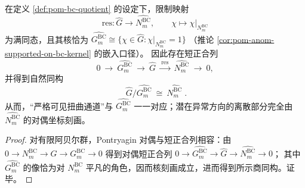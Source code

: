 \begin{corollary}\label{cor:pom-bc-pontryagin-dual-classification}
在定义 \ref{def:pom-bc-quotient} 的设定下，限制映射
\[
\mathrm{res}:\widehat G\longrightarrow \widehat{N^{\mathrm{BC}}_m},
\qquad
\chi\longmapsto \chi|_{N^{\mathrm{BC}}_m}
\]
为满同态，且其核恰为
\(\widehat{G^{\mathrm{BC}}_m}\cong\{\chi\in\widehat G:\chi|_{N^{\mathrm{BC}}_m}=1\}\)
（推论 \ref{cor:pom-anom-supported-on-bc-kernel} 的嵌入口径）。
因此存在短正合列
\[
0\ \longrightarrow\ \widehat{G^{\mathrm{BC}}_m}\ \longrightarrow\ \widehat G\ \xrightarrow{\ \mathrm{res}\ }\ \widehat{N^{\mathrm{BC}}_m}\ \longrightarrow\ 0,
\]
并得到自然同构
\[
\boxed{\;
\widehat G/\widehat{G^{\mathrm{BC}}_m}\ \cong\ \widehat{N^{\mathrm{BC}}_m}\; }.
\]
从而，“严格可见扭曲通道”与 \(\widehat{G^{\mathrm{BC}}_m}\) 一一对应；潜在异常方向的离散部分完全由 \(\widehat{N^{\mathrm{BC}}_m}\) 的对偶坐标刻画。
\end{corollary}
\begin{proof}
对有限阿贝尔群，Pontryagin 对偶与短正合列相容：由 \(0\to N^{\mathrm{BC}}_m\to G\to G^{\mathrm{BC}}_m\to 0\) 得到对偶短正合列
\(
0\to \widehat{G^{\mathrm{BC}}_m}\to \widehat G\to \widehat{N^{\mathrm{BC}}_m}\to 0
\)；
其中 \(\widehat{G^{\mathrm{BC}}_m}\) 的像恰为对 \(N^{\mathrm{BC}}_m\) 平凡的角色，因而核刻画成立，进而得到所示商同构。证毕。
\end{proof}
